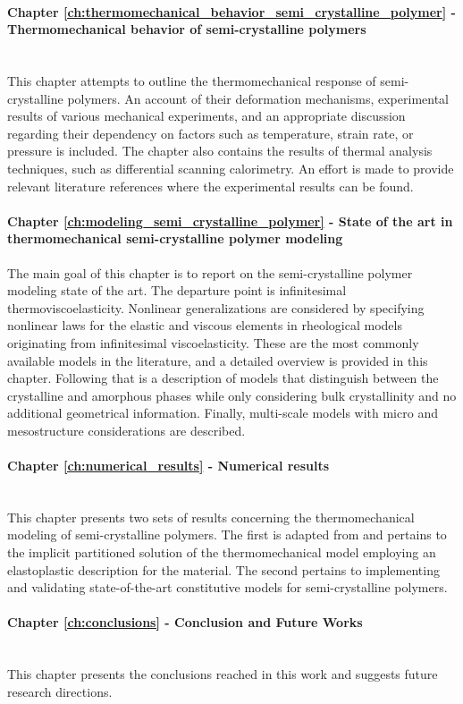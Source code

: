 \paragraph{Chapter \ref{ch:thermomechanical_behavior_semi_crystalline_polymer} - Thermomechanical behavior of semi-crystalline polymers}\mbox{}\\
This chapter attempts to outline the thermomechanical response of semi-crystalline polymers.
An account of their deformation mechanisms, experimental results of various mechanical experiments, and an appropriate discussion regarding their dependency on factors such as temperature, strain rate, or pressure is included.
The chapter also contains the results of thermal analysis techniques, such as differential scanning calorimetry.
An effort is made to provide relevant literature references where the experimental results can be found.

\paragraph{Chapter \ref{ch:modeling_semi_crystalline_polymer} - State of the art in thermomechanical semi-crystalline polymer modeling}\mbox{}
The main goal of this chapter is to report on the semi-crystalline polymer modeling state of the art.
The departure point is infinitesimal thermoviscoelasticity.
Nonlinear generalizations are considered by specifying nonlinear laws for the elastic and viscous elements in rheological models originating from infinitesimal viscoelasticity.
These are the most commonly available models in the literature, and a detailed overview is provided in this chapter.
Following that is a description of models that distinguish between the crystalline and amorphous phases while only considering bulk crystallinity and no additional geometrical information.
Finally, multi-scale models with micro and mesostructure considerations are described.

\paragraph{Chapter \ref{ch:numerical_results} - Numerical results}\mbox{}\\
This chapter presents two sets of results concerning the thermomechanical modeling of semi-crystalline polymers.
The first is adapted from \cite{vila-chaNumericalAssessmentPartitioned2023a} and pertains to the implicit partitioned solution of the thermomechanical model employing an elastoplastic description for the material.
The second pertains to implementing and validating state-of-the-art constitutive models for semi-crystalline polymers.

\paragraph{Chapter \ref{ch:conclusions} - Conclusion and Future Works}\mbox{} \\
This chapter presents the conclusions reached in this work and suggests future research directions.

